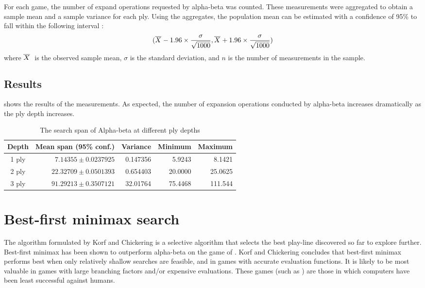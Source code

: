 For each game, the number of expand operations requested by alpha-beta was counted.  These measurements were aggregated to obtain a sample mean and a sample variance for each ply.  Using the aggregates, the population mean can be estimated with a confidence of 95\% to fall within the following interval \cite{underhill:stat}: 
\begin{equation}
(\overline{X}_{\mbox{\tiny }} - 1.96 \times \frac{\sigma} {\sqrt{1000}},
\overline{X}_{\mbox{\tiny }} + 1.96 \times \frac{\sigma}{\sqrt{1000}})
\label{eq:tree-conf95}
\end{equation} 
where  $\mean\ $ is the observed sample mean, $\sigma$ is the standard deviation, and $n$ is the number of measurements in the sample.    

\subsection*{Results}
 shows the results of the measurements.  As expected, the number of expansion operations conducted by alpha-beta increases dramatically as the ply depth increases.
\begin{table}[ht!]
	\caption{The search span of Alpha-beta at different ply depths}
	\centering
		\begin{tabular}{|c|r|r|r|r|}
		\hline
		\bf Depth & \bf Mean span (95\% conf.) & \bf Variance & \bf Minimum& \bf Maximum \\
		\hline
1 ply & $ 7.14355 \pm 0.0237925$ & 0.147356 & 5.9243 & 8.1421 \\
2 ply & $22.32709 \pm 0.0501393$ & 0.654403 & 20.0000 & 25.0625 \\
3 ply & $91.29213 \pm 0.3507121$ & 32.01764 & 75.4468 & 111.544 \\
		\hline
		\end{tabular}
	\label{tab:tree-ab-span}
\end{table}
   


\section{Best-first minimax search}
\label{sec:tree-best-first}
The  algorithm formulated by Korf and Chickering  \cite{korf:best} is a selective algorithm that selects the best play-line discovered so far to explore further. Best-first minimax has been shown to outperform alpha-beta on the game of .  Korf and Chickering concludes that best-first minimax performs best when only relatively shallow searches are feasible, and in games with accurate evaluation functions.  It is likely to be most valuable in games with large branching factors and/or expensive evaluations.  These games (such as ) are those in which computers have been least successful against humans.    

